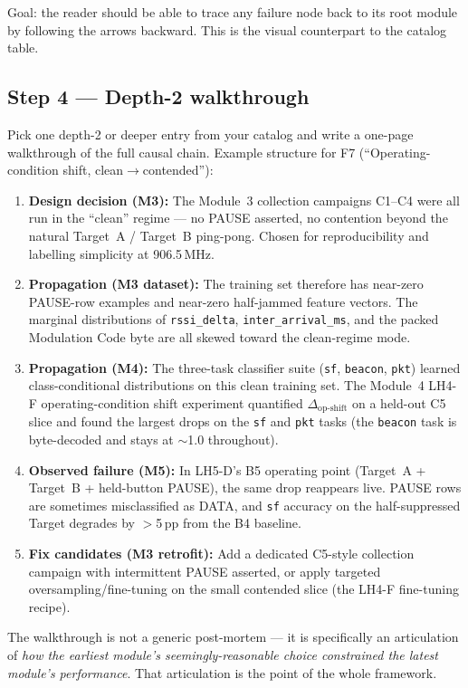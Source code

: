 \documentclass[11pt,letterpaper]{article}
\begin{document}
Goal: the reader should be able to trace any failure node back to its root module by following the arrows backward. This is the visual counterpart to the catalog table.

\subsection{Step 4 --- Depth-2 walkthrough}
Pick one depth-2 or deeper entry from your catalog and write a one-page walkthrough of the full causal chain. Example structure for F7 (``Operating-condition shift, clean$\to$contended''):

\begin{enumerate}[leftmargin=2em]
	\item \textbf{Design decision (M3):} The Module~3 collection campaigns C1--C4 were all run in the ``clean'' regime --- no PAUSE asserted, no contention beyond the natural Target~A / Target~B ping-pong. Chosen for reproducibility and labelling simplicity at 906.5\,MHz.
	\item \textbf{Propagation (M3 dataset):} The training set therefore has near-zero PAUSE-row examples and near-zero half-jammed feature vectors. The marginal distributions of \texttt{rssi\_delta}, \texttt{inter\_arrival\_ms}, and the packed Modulation Code byte are all skewed toward the clean-regime mode.
	\item \textbf{Propagation (M4):} The three-task classifier suite (\texttt{sf}, \texttt{beacon}, \texttt{pkt}) learned class-conditional distributions on this clean training set. The Module~4 LH4-F operating-condition shift experiment quantified $\Delta_{\text{op-shift}}$ on a held-out C5 slice and found the largest drops on the \texttt{sf} and \texttt{pkt} tasks (the \texttt{beacon} task is byte-decoded and stays at $\sim$1.0 throughout).
	\item \textbf{Observed failure (M5):} In LH5-D's B5 operating point (Target~A + Target~B + held-button PAUSE), the same drop reappears live. PAUSE rows are sometimes misclassified as DATA, and \texttt{sf} accuracy on the half-suppressed Target degrades by $>$5\,pp from the B4 baseline.
	\item \textbf{Fix candidates (M3 retrofit):} Add a dedicated C5-style collection campaign with intermittent PAUSE asserted, or apply targeted oversampling/fine-tuning on the small contended slice (the LH4-F fine-tuning recipe).
\end{enumerate}

The walkthrough is not a generic post-mortem --- it is specifically an articulation of \emph{how the earliest module's seemingly-reasonable choice constrained the latest module's performance}. That articulation is the point of the whole framework.
\end{document}
